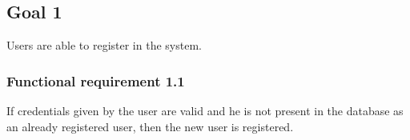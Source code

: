 \subsection{Goal 1}
Users are able to register in the system.

\setcounter{secnumdepth}{3}
\subsubsection{Functional requirement 1.1}
If credentials given by the user are valid and he is not present in the database as an already registered user, then the new user is registered.
